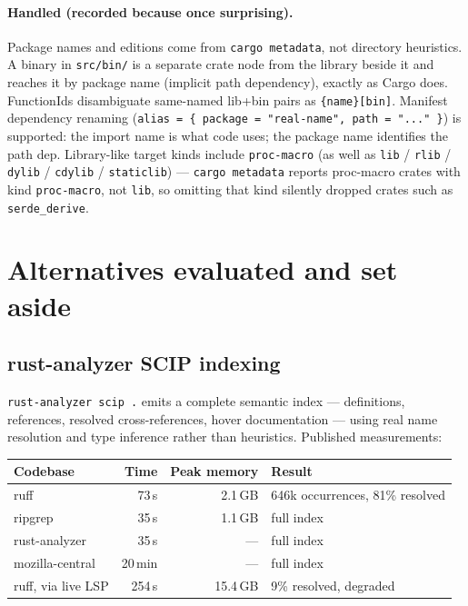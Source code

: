 \documentclass[11pt,a4paper]{article}
\begin{document}
\paragraph{Handled (recorded because once surprising).} Package names and
editions come from \verb|cargo metadata|, not directory heuristics. A binary in
\verb|src/bin/| is a separate crate node from the library beside it and reaches
it by package name (implicit path dependency), exactly as Cargo does.
FunctionIds disambiguate same-named lib+bin pairs as \verb|{name}[bin]|.
Manifest dependency renaming
(\verb|alias = { package = "real-name", path = "..." }|) is supported: the
import name is what code uses; the package name identifies the path dep.
Library-like target kinds include \verb|proc-macro| (as well as \verb|lib| /
\verb|rlib| / \verb|dylib| / \verb|cdylib| / \verb|staticlib|) ---
\verb|cargo metadata| reports proc-macro crates with kind \verb|proc-macro|,
not \verb|lib|, so omitting that kind silently dropped crates such as
\verb|serde_derive|.

\section{Alternatives evaluated and set aside}

\subsection{rust-analyzer SCIP indexing}
\label{sec:scip}

\verb|rust-analyzer scip .| emits a complete semantic index --- definitions,
references, resolved cross-references, hover documentation --- using real name
resolution and type inference rather than heuristics. Published measurements:

\begin{table}[h]
\centering
\begin{tabular}{@{}lrrl@{}}
\toprule
\textbf{Codebase} & \textbf{Time} & \textbf{Peak memory} & \textbf{Result} \\
\midrule
ruff              & 73\,s   & 2.1\,GB & 646k occurrences, 81\% resolved \\
ripgrep           & 35\,s   & 1.1\,GB & full index \\
rust-analyzer     & 35\,s   & ---     & full index \\
mozilla-central   & 20\,min & ---     & full index \\
\midrule
ruff, via live LSP & 254\,s & 15.4\,GB & 9\% resolved, degraded \\
\bottomrule
\end{tabular}
\end{table}
\end{document}
